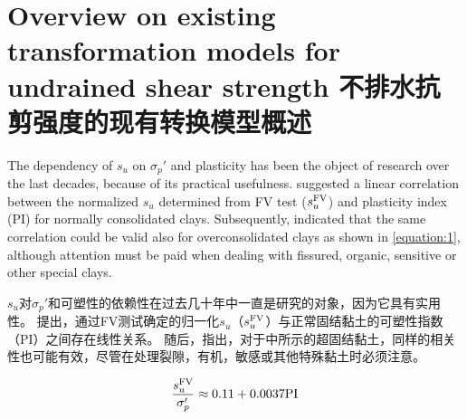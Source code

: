 \section{Overview on existing transformation models for undrained shear strength 不排水抗剪强度的现有转换模型概述}

\begin{paracol}{2}

    The dependency of $s_u$ on $\sigma_p'$ and plasticity has been the object of research over the last decades, because of its practical usefulness. \citet{Skempton195419} suggested a linear correlation between the normalized $s_u$ determined from FV test ($s_u^{\rm{FV}}$) and plasticity index (PI) for normally consolidated clays. Subsequently, \citet{Chandler198813} indicated that the same correlation could be valid also for overconsolidated clays as shown in \autoref{equation:1}, although attention must be paid when dealing with fissured, organic, sensitive or other special clays.

    \switchcolumn

    $s_u$对$\sigma_p'$和可塑性的依赖性在过去几十年中一直是研究的对象，因为它具有实用性。 \citet{Skempton195419}提出，通过FV测试确定的归一化$s_u$（$s_u^{\rm{FV}}$）与正常固结黏土的可塑性指数（PI）之间存在线性关系。 随后，\citet{Chandler198813}指出，对于中所示的超固结黏土，同样的相关性也可能有效，尽管在处理裂隙，有机，敏感或其他特殊黏土时必须注意。

\end{paracol}

\begin{align}
    \dfrac{s_u^{\rm{FV}}}{\sigma_p'}\approx{}0.11+0.0037\rm{PI}
    \label{equation:1}
\end{align}

